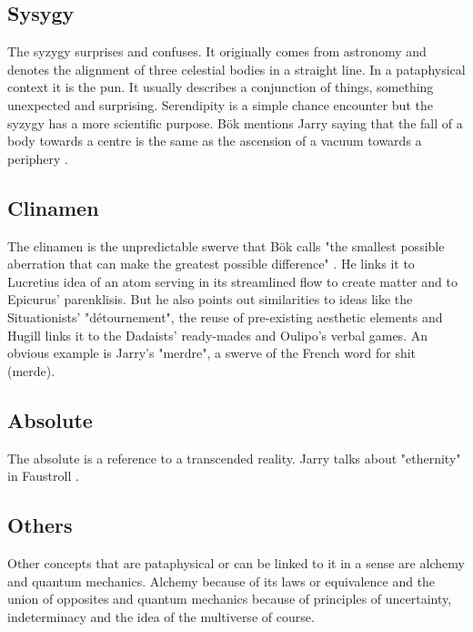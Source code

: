 \subsection{Sysygy}

The syzygy surprises and confuses. It originally comes from astronomy and denotes the alignment of three celestial bodies in a straight line. In a pataphysical context it is the pun. It usually describes a conjunction of things, something unexpected and surprising. Serendipity is a simple chance encounter but the syzygy has a more scientific purpose. Bök mentions Jarry saying that the fall of a body towards a centre is the same as the ascension of a vacuum towards a periphery \citep[p.42]{Bok2002}.

\subsection{Clinamen}

The clinamen is the unpredictable swerve that Bök calls "the smallest possible aberration that can make the greatest possible difference"  \citep[p.43]{Bok2002}. He links it to Lucretius idea of an atom serving in its streamlined flow to create matter and to Epicurus' parenklisis. But he also points out similarities to ideas like the Situationists' "détournement", the reuse of pre-existing aesthetic elements and Hugill links it to the Dadaists' ready-mades and Oulipo's verbal games. An obvious example is Jarry's "merdre", a swerve of the French word for shit (merde).

\subsection{Absolute}

The absolute is a reference to a transcended reality. Jarry talks about "ethernity" in Faustroll \citep[p.104]{Jarry1996}.

\subsection*{Others}

Other concepts that are pataphysical or can be linked to it in a sense are alchemy and quantum mechanics. Alchemy because of its laws or equivalence and the union of opposites \citep{Hugill2012} and quantum mechanics because of principles of uncertainty, indeterminacy and the idea of the multiverse of course.

